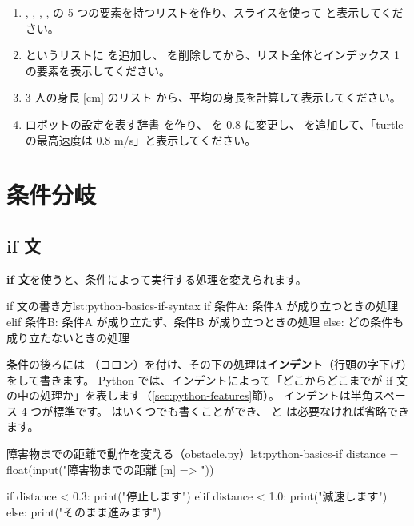 \begin{exercise}
\begin{enumerate}
  \item {}, , , ,  の 5 つの要素を持つリストを作り、スライスを使って  と表示してください。
  \item {} というリストに  を追加し、 を削除してから、リスト全体とインデックス 1 の要素を表示してください。
  \item 3 人の身長 [cm] のリスト \cmd{[176, 158, 164]} から、平均の身長を計算して表示してください。
  \item ロボットの設定を表す辞書  を作り、 を 0.8 に変更し、 を追加して、「turtle の最高速度は 0.8 m/s」と表示してください。
\end{enumerate}
\end{exercise}

\section{条件分岐}
\label{sec:python-basics-if}

\subsection{if 文}

\textbf{if 文}を使うと、条件によって実行する処理を変えられます。

\begin{codelisting}[style=python]{if 文の書き方}{lst:python-basics-if-syntax}
if 条件A:
    条件A が成り立つときの処理
elif 条件B:
    条件A が成り立たず、条件B が成り立つときの処理
else:
    どの条件も成り立たないときの処理
\end{codelisting}

条件の後ろには \cmd{:}（コロン）を付け、その下の処理は\textbf{インデント}（行頭の字下げ）をして書きます。
Python では、インデントによって「どこからどこまでが if 文の中の処理か」を表します（\ref{sec:python-features}節）。
インデントは半角スペース 4 つが標準です。
 はいくつでも書くことができ、 と  は必要なければ省略できます。

\begin{codelisting}[style=python]{障害物までの距離で動作を変える（obstacle.py）}{lst:python-basics-if}
distance = float(input("障害物までの距離 [m] => "))

if distance < 0.3:
    print("停止します")
elif distance < 1.0:
    print("減速します")
else:
    print("そのまま進みます")
\end{codelisting}

